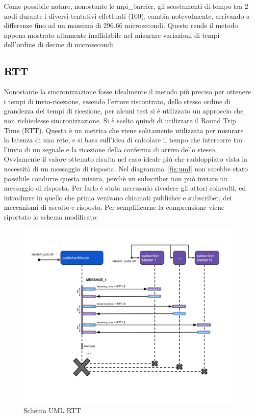 Come possibile notare, nonostante le mpi\_barrier, gli scostamenti di tempo tra 2 nodi durante i diversi tentativi effettuati (100), cambia notevolmente, arrivando a differenze fino ad un massimo di 296.66 microsecondi. 
Questo rende il metodo appena mostrato altamente inaffidabile nel misurare variazioni di tempi dell'ordine di decine di microsecondi. 


\subsection{RTT}\label{sec:timeRTT}

Nonostante la sincronizzazione fosse idealmente il metodo più preciso per ottenere i tempi di invio-ricezione, essendo l'errore riscontrato, dello stesso ordine di grandezza dei tempi di ricezione, per alcuni test si è utilizzato un approccio che non richiedesse sincronizzazione. Si è scelto quindi di utilizzare il Round Trip Time (RTT).
Questa è un metrica che viene solitamente utilizzata per misurare la latenza di una rete, e si basa sull'idea di calcolare il tempo che intercorre tra l'invio di un segnale e la ricezione della conferma di arrivo dello stesso. Ovviamente il valore ottenuto risulta nel caso ideale più che raddoppiato vista la necessità di un messaggio di risposta. Nel diagramma~\ref{fig:uml} non sarebbe stato possibile condurre questa misura, perchè un subscriber non può inviare un messaggio di risposta.
Per farlo è stato necessario rivedere gli attori coinvolti, ed introdurre in quello che prima venivano chiamati publisher e subscriber, dei meccanismi di ascolto e risposta.
Per semplificarne la comprensione viene riportato lo schema modificato:

\begin{figure}[H]
    \includegraphics[width=\textwidth]{./img/RTT.png}
    \caption{Schema UML RTT}\label{fig:rtt_uml}
\end{figure} 

